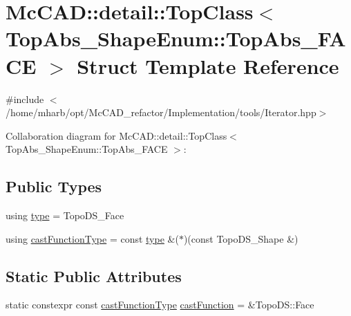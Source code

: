 \hypertarget{structMcCAD_1_1detail_1_1TopClass_3_01TopAbs__ShapeEnum_1_1TopAbs__FACE_01_4}{}\section{Mc\+C\+AD\+:\+:detail\+:\+:Top\+Class$<$ Top\+Abs\+\_\+\+Shape\+Enum\+:\+:Top\+Abs\+\_\+\+F\+A\+CE $>$ Struct Template Reference}
\label{structMcCAD_1_1detail_1_1TopClass_3_01TopAbs__ShapeEnum_1_1TopAbs__FACE_01_4}


{\ttfamily \#include $<$/home/mharb/opt/\+Mc\+C\+A\+D\+\_\+refactor/\+Implementation/tools/\+Iterator.\+hpp$>$}



Collaboration diagram for Mc\+C\+AD\+:\+:detail\+:\+:Top\+Class$<$ Top\+Abs\+\_\+\+Shape\+Enum\+:\+:Top\+Abs\+\_\+\+F\+A\+CE $>$\+:
\subsection*{Public Types}
\begin{DoxyCompactItemize}
\item 
using \hyperlink{structMcCAD_1_1detail_1_1TopClass_3_01TopAbs__ShapeEnum_1_1TopAbs__FACE_01_4_a3c802e4d15e9fbb32d63b27ed9194171}{type} = Topo\+D\+S\+\_\+\+Face
\item 
using \hyperlink{structMcCAD_1_1detail_1_1TopClass_3_01TopAbs__ShapeEnum_1_1TopAbs__FACE_01_4_ac529ada2f943ba0b7d0b5154805bdfbd}{cast\+Function\+Type} = const \hyperlink{structMcCAD_1_1detail_1_1TopClass_3_01TopAbs__ShapeEnum_1_1TopAbs__FACE_01_4_a3c802e4d15e9fbb32d63b27ed9194171}{type} \&($\ast$)(const Topo\+D\+S\+\_\+\+Shape \&)
\end{DoxyCompactItemize}
\subsection*{Static Public Attributes}
\begin{DoxyCompactItemize}
\item 
static constexpr const \hyperlink{structMcCAD_1_1detail_1_1TopClass_3_01TopAbs__ShapeEnum_1_1TopAbs__FACE_01_4_ac529ada2f943ba0b7d0b5154805bdfbd}{cast\+Function\+Type} \hyperlink{structMcCAD_1_1detail_1_1TopClass_3_01TopAbs__ShapeEnum_1_1TopAbs__FACE_01_4_ad56a20382d20c610b6544ec0891129f0}{cast\+Function} = \&Topo\+D\+S\+::\+Face
\end{DoxyCompactItemize}


